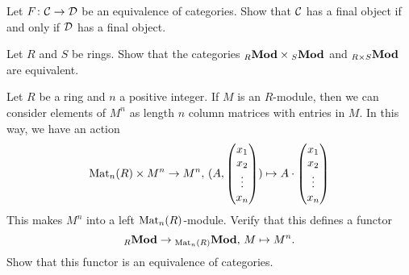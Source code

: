 \begin{exercise} \label{exc:equivalence-final}
Let $F\colon {\mathcal{C}} \to {\mathcal{D}}$ be an equivalence of categories. Show that ${\mathcal{C}}$ has a final object if and only if ${\mathcal{D}}$ has a final object.
\end{exercise}


\begin{exercise}
Let $R$ and $S$ be rings. Show that the categories ${}_R\mathbf{Mod}\times {}_S\mathbf{Mod}$ and ${}_{R\times S}\mathbf{Mod}$ are equivalent.
\end{exercise}


\begin{exercise}
Let $R$ be a ring and $n$ a positive integer.  If $M$ is an $R$-module, then we can consider elements of $M^n$ as length $n$ column matrices with entries in $M$. In this way, we have an action
\[
	\operatorname{Mat}_n(R) \times M^n \to M^n,\, (A,    \begin{pmatrix} x_1 \\ x_2 \\ \vdots \\ x_n \end{pmatrix} ) \mapsto
	A \cdot   \begin{pmatrix} x_1 \\ x_2 \\ \vdots \\ x_n \end{pmatrix}
\]
This makes $M^n$ into a left $\operatorname{Mat}_n(R)$-module. Verify that this defines a functor
\[
	{}_R\mathbf{Mod} \to {}_{\operatorname{Mat}_n(R)}\mathbf{Mod},\, M \mapsto M^n.
\]
Show that this functor is an equivalence of categories.
\end{exercise}





